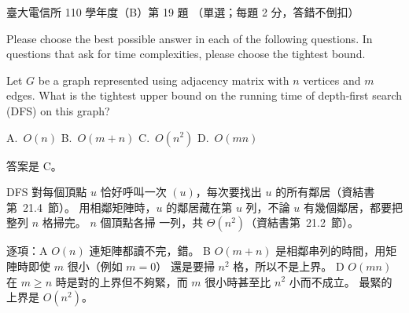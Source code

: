 \begin{pastexam}[label={px:ntu-110-comm-dsa-19}]{臺大電信所 110 學年度（B）第 19 題}
（單選；每題 2 分，答錯不倒扣）

Please choose the best possible answer in each of the following questions. In questions that ask for time complexities, please choose the tightest bound.

Let $G$ be a graph represented using adjacency matrix with $n$ vertices and $m$ edges. What is the tightest upper bound on the running time of depth-first search (DFS) on this graph?

A.~$O(n)$ \qquad B.~$O(m+n)$ \qquad C.~$O(n^2)$ \qquad D.~$O(mn)$
\end{pastexam}

\begin{pastsoln}
答案是 C。

DFS 對每個頂點 $u$ 恰好呼叫一次 $(u)$，每次要找出 $u$ 的所有鄰居（資結書第~21.4~節）。
用相鄰矩陣時，$u$ 的鄰居藏在第 $u$ 列，不論 $u$ 有幾個鄰居，都要把整列 $n$ 格掃完。 $n$ 個頂點各掃
一列，共 $\Theta(n^2)$（資結書第~21.2~節）。

逐項：A $O(n)$ 連矩陣都讀不完，錯。 B $O(m + n)$ 是相鄰串列的時間，用矩陣時即使 $m$ 很小（例如 $m = 0$）
還是要掃 $n^2$ 格，所以不是上界。 D $O(mn)$ 在 $m \ge n$ 時是對的上界但不夠緊，而 $m$ 很小時甚至比
$n^2$ 小而不成立。 最緊的上界是 $O(n^2)$。
\end{pastsoln}
